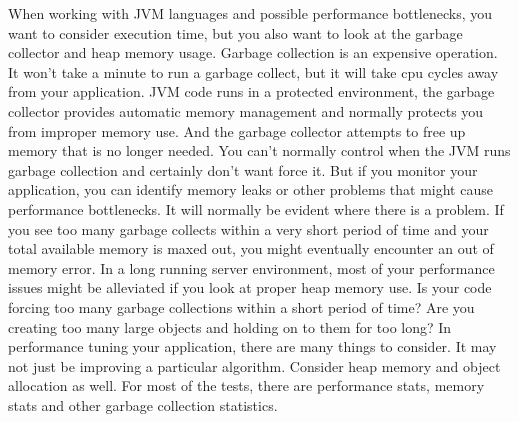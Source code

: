    When working with JVM languages and possible performance bottlenecks, you
   want to consider execution time, but you also want to look at the garbage
   collector and heap memory usage. Garbage collection is an expensive
   operation. It won't take a minute to run a garbage collect, but it will take
   cpu cycles away from your application. JVM code runs in a protected
   environment, the garbage collector provides automatic memory management and
   normally protects you from improper memory use. And the garbage collector
   attempts to free up memory that is no longer needed. You can't normally
   control when the JVM runs garbage collection and certainly don't want force
   it. But if you monitor your application, you can identify memory leaks or
   other problems that might cause performance bottlenecks. It will normally be
   evident where there is a problem. If you see too many garbage collects within
   a very short period of time and your total available memory is maxed out, you
   might eventually encounter an out of memory error. In a long running server
   environment, most of your performance issues might be alleviated if you look
   at proper heap memory use. Is your code forcing too many garbage collections
   within a short period of time? Are you creating too many large objects and
   holding on to them for too long? In performance tuning your application,
   there are many things to consider. It may not just be improving a particular
   algorithm. Consider heap memory and object allocation as well. For most of
   the tests, there are performance stats, memory stats and other garbage
   collection statistics.

